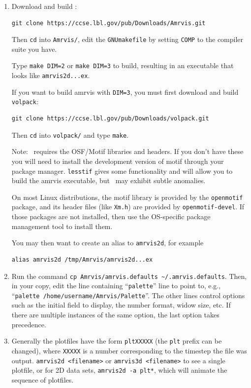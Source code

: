 \begin{enumerate}

\item Download and build \amrvis:
\begin{verbatim}
git clone https://ccse.lbl.gov/pub/Downloads/Amrvis.git
\end{verbatim}

Then {\tt cd} into {\tt Amrvis/}, edit the {\tt GNUmakefile} by
setting {\tt COMP} to the compiler suite you have.

Type {\tt make DIM=2} or {\tt make DIM=3} to build, 
resulting in an executable that looks like {\tt amrvis2d...ex}.

If you want to build amrvis with {\tt DIM=3}, you must first
download and build {\tt volpack}:
\begin{verbatim}
git clone https://ccse.lbl.gov/pub/Downloads/volpack.git
\end{verbatim}

Then {\tt cd} into {\tt volpack/} and type {\tt make}.

Note: \amrvis\ requires the OSF/Motif libraries and headers. If you don't have these 
you will need to install the development version of motif through your package manager. 
{\tt lesstif} gives some functionality and will allow you to build the amrvis executable, 
but \amrvis\ may exhibit subtle anomalies.

On most Linux distributions, the motif library is provided by the
{\tt openmotif} package, and its header files (like {\tt Xm.h}) are provided
by {\tt openmotif-devel}. If those packages are not installed, then use the
OS-specific package management tool to install them. 

You may then want to create an alias to {\tt amrvis2d}, for example
\begin{verbatim}
alias amrvis2d /tmp/Amrvis/amrvis2d...ex
\end{verbatim}

\item Run the command {\tt cp Amrvis/amrvis.defaults \textasciitilde/.amrvis.defaults}.
Then, in your copy, edit the line containing ``{\tt palette}'' line to point to, e.g., 
``{\tt palette  /home/username/Amrvis/Palette}''.  The other lines control
options such as the initial field to display, the number format, widow size, etc.
If there are multiple instances of the same option, the last option takes precedence.

\item Generally the plotfiles have the form {\tt pltXXXXX} 
  (the {\tt plt} prefix can be changed), where {\tt XXXXX} is a number 
  corresponding to the timestep the file
  was output.  {\tt amrvis2d <filename>} or {\tt amrvis3d <filename>}
  to see a single plotfile, 
  or for 2D data sets, {\tt amrvis2d -a plt*}, which will animate the 
  sequence of plotfiles.


\end{enumerate}
